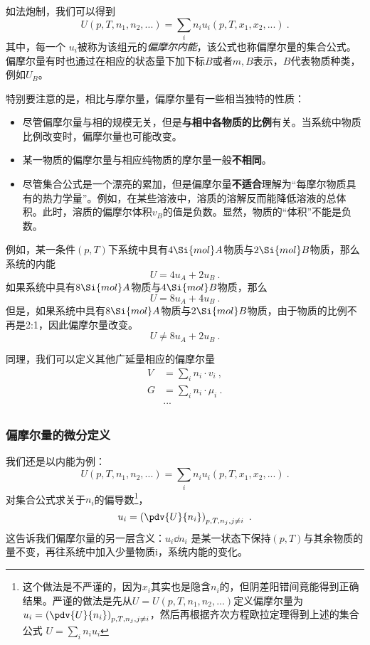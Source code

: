 如法炮制，我们可以得到
$$ U (p, T, n_1, n_2, ...) = \sum_i n_i u_i(p, T, x_1, x_2, ...)~. $$
其中，每一个 $u_i$被称为该组元的\textsl{偏摩尔内能}，该公式也称偏摩尔量的集合公式。偏摩尔量有时也通过在相应的状态量下加下标$B$或者$m,B$表示，$B$代表物质种类，例如$U_B$。

特别要注意的是，相比与摩尔量，偏摩尔量有一些相当独特的性质：
\begin{itemize}
\item 尽管偏摩尔量与相的规模无关，但是\textbf{与相中各物质的比例}有关。当系统中物质比例改变时，偏摩尔量也可能改变。
\item 某一物质的偏摩尔量与相应纯物质的摩尔量一般\textbf{不相同}。
\item 尽管集合公式是一个漂亮的累加，但是偏摩尔量\textbf{不适合}理解为“每摩尔物质具有的热力学量”。例如，在某些溶液中，溶质的溶解反而能降低溶液的总体积。此时，溶质的偏摩尔体积$v_B$的值是负数。显然，物质的“体积”不能是负数。
\end{itemize}

\begin{example}{}
例如，某一条件$(p,T)$下系统中具有$4 \Si{mol} A$物质与$2 \Si{mol} B$物质，那么系统的内能
$$U = 4 u_{A} +  2 u_B~. $$
如果系统中具有$8 \Si{mol} A$物质与$4 \Si{mol} B$物质，那么
$$U = 8 u_A +  4 u_B~.$$
但是，如果系统中具有$8 \Si{mol} A$物质与$2 \Si{mol} B$物质，由于物质的比例不再是2:1，因此偏摩尔量改变。
$$U \ne 8 u_A +  2 u_B~.$$
\end{example}

同理，我们可以定义其他广延量相应的偏摩尔量
$$
\begin{aligned}
V &= \sum_i  n_i \cdot v_i ~,\\
G &= \sum_i  n_i \cdot \mu_i~.\\
&...\\
\end{aligned}
$$

\subsubsection{偏摩尔量的微分定义}
我们还是以内能为例：
$$ U (p, T, n_1, n_2, ...) = \sum_i n_i u_i(p, T, x_1, x_2, ...)~. $$
对集合公式求关于$n_i$的偏导数\footnote{这个做法是不严谨的，因为$x_i$其实也是隐含$n_i$的，但阴差阳错间竟能得到正确结果。严谨的做法是先从$U=U(p,T,n_1, n_2,...)$定义偏摩尔量为 ${u_i} = \left(\pdv{U}{n_i}\right)_{p,T,n_j, j \neq i}$，然后再根据齐次方程欧拉定理得到上述的集合公式 $ U = \sum_i n_i u_i $}，
$$
{u_i} = \left(\pdv{U}{n_i}\right)_{p,T,n_j, j \neq i} ~.
$$
这告诉我们偏摩尔量的另一层含义：$u_i \dd n_i$ 是某一状态下保持$(p,T)$与其余物质的量不变，再往系统中加入少量物质i，系统内能的变化。

